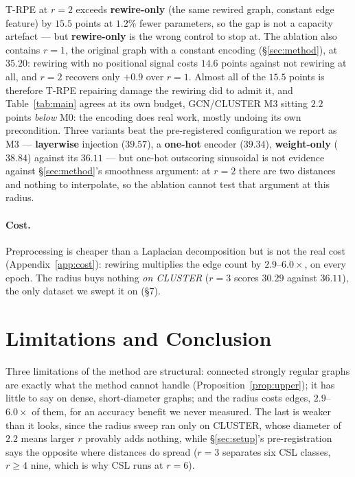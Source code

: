 \documentclass[11pt]{article}
\begin{document}
T-RPE at $r=2$ exceeds \textbf{rewire-only} (the same rewired graph, constant edge feature) by
$15.5$ points at $1.2\%$ fewer parameters, so the gap is not a capacity artefact --- but
\textbf{rewire-only} is the wrong control to stop at. The ablation also contains $r=1$, the
original graph with a constant encoding (\S\ref{sec:method}), at $35.20$: rewiring with no
positional signal costs $14.6$ points against not rewiring at all, and $r=2$ recovers only $+0.9$
over $r=1$. Almost all of the $15.5$ points is therefore T-RPE repairing damage the rewiring did
to admit it, and Table~\ref{tab:main} agrees at its own budget, GCN/CLUSTER M3 sitting $2.2$
points \emph{below} M0: the encoding does real work, mostly undoing its own precondition. Three variants beat the pre-registered configuration we report as M3 ---
\textbf{layerwise} injection ($39.57$), a \textbf{one-hot} encoder ($39.34$),
\textbf{weight-only} ($38.84$) against its $36.11$ --- but one-hot outscoring sinusoidal is not
evidence against \S\ref{sec:method}'s smoothness argument: at $r=2$ there are two distances and
nothing to interpolate, so the ablation cannot test that argument at this radius.

\paragraph{Cost.}
Preprocessing is cheaper than a Laplacian decomposition but is not the real cost
(Appendix~\ref{app:cost}): rewiring multiplies the edge count by $2.9$--$6.0\times$, on every
epoch. The radius buys nothing \emph{on CLUSTER} ($r=3$ scores $30.29$ against $36.11$), the only
dataset we swept it on (\S7).

\section{Limitations and Conclusion}

Three limitations of the method are structural: connected strongly regular graphs are exactly what the method
cannot handle (Proposition~\ref{prop:upper}); it has little to say on dense, short-diameter
graphs; and the radius costs edges, $2.9$--$6.0\times$ of them, for an accuracy benefit we never
measured. The last is weaker than it looks, since the radius sweep ran only on CLUSTER, whose
diameter of $2.2$ means larger $r$ provably adds nothing, while \S\ref{sec:setup}'s
pre-registration says the opposite where distances do spread ($r=3$ separates six CSL classes,
$r\ge4$ nine, which is why CSL runs at $r=6$).
\end{document}
